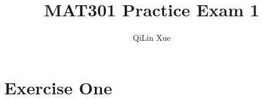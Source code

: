 \documentclass{article}
\title{MAT301 Practice Exam 1}
\author{QiLin Xue}
\date{}
\begin{document}
\maketitle

\section{Exercise One}











% 
% 
% 
\end{document}
